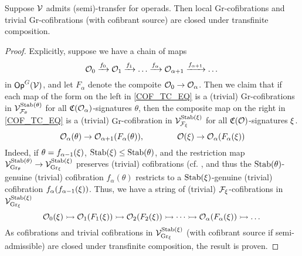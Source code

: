 \documentclass[a4paper,10pt
,draft
]{article}%
\renewcommand{\F}{\mathcal F}
\renewcommand{\1}{\ensuremath{\mathbb{id}}}
\begin{document}
\begin{lemma}
      \label{COF_TC_LEM}
      Suppose $\mathcal V$ admits (semi)-transfer for operads.
      Then local $\mathrm{Gr}$-cofibrations and  trivial $\mathrm{Gr}$-cofibrations (with cofibrant source) are closed under transfinite composition.
\end{lemma}
\begin{proof}
      Explicitly, suppose we have a chain of maps
      \begin{equation}
            \mathcal{O}_0 \xrightarrow{f_0} \mathcal{O}_1 \xrightarrow{f_1} \dots \xrightarrow{f_\alpha} \mathcal{O}_{\alpha+1} \xrightarrow{f_{\alpha+1}} \dots
      \end{equation}
      in $\mathsf{Op}^G(\mathcal V)$, and let $F_\alpha$ denote the compoite $\mathcal{O}_0 \to \mathcal{O}_\alpha$.
      Then we claim that
      if each map of the form on the left in \eqref{COF_TC_EQ}
      is a (trivial) $\mathrm{Gr}$-cofibrations in $\V^{\Stab(\theta)}_{\F_\theta}$
      for all $\mathfrak C(\mathcal{O}_\alpha)$-signatures $\theta$, then
      the composite map on the right in \eqref{COF_TC_EQ}
      is a (trivial) $\mathrm{Gr}$-cofibration in $\V^{\Stab(\ksi)}_{\F_\ksi}$
      for all $\mathfrak C(\mathcal{O})$-signatures $\xi$.     
       \begin{equation}
            \label{COF_TC_EQ}
            \mathcal{O}_\alpha(\theta) \to \mathcal{O}_{\alpha+1}(F_\alpha(\theta)),
            \qquad  \qquad
            \mathcal{O}(\xi) \to \mathcal{O}_\alpha(F_\alpha(\xi))
      \end{equation}
      Indeed, if $\theta = f_{\alpha-1}(\xi)$,
      $\mathrm{Stab}(\xi) \leq \mathrm{Stab}(\theta)$,
      and the restriction map $\mathcal V^{\mathrm{Stab}(\theta)}_{\mathrm{Gr}_\theta} \to \mathcal V^{\mathrm{Stab}(\xi)}_{\mathrm{Gr}_\xi}$
      preserves (trivial) cofibrations (cf. \cite[Prop 6.6]{BP17},
      and thus the $\mathrm{Stab}(\theta)$-genuine (trivial) cofibration $f_\alpha(\theta)$ 
      restricts to a $\mathrm{Stab}(\xi)$-genuine (trivial) cofibration $f_\alpha(f_{\alpha-1}(\xi))$.
      Thus, we have a string of (trivial) $\F_\ksi$-cofibrations in $\mathcal V^{\mathrm{Stab}(\xi)}_{\mathrm{Gr}_\xi}$
      \begin{equation}
            \mathcal{O}_0(\xi) \rightarrowtail \mathcal{O}_1(F_1(\xi)) \rightarrowtail \mathcal{O}_2(F_2(\xi)) \rightarrowtail \dots
            \rightarrowtail \mathcal{O}_\alpha(F_\alpha(\xi)) \rightarrowtail \dots
      \end{equation}
      As cofibrations and trivial cofibrations in $\mathcal V^{\mathrm{Stab}(\xi)}_{\mathrm{Gr}_\xi}$ (with cofibrant source if semi-admissible)
      are closed under transfinite composition, the result is proven.
\end{proof}
\end{document}
